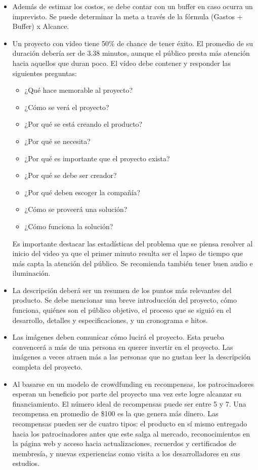 \begin{itemize}
	\item Además de estimar los costos, se debe contar con un buffer en caso ocurra un imprevisto. Se puede determinar la meta a través de la fórmula (Gastos + Buffer) x Alcance.
	\item Un proyecto con video tiene 50\% de chance de tener éxito. El promedio de su duración debería ser de 3.38 minutos, aunque el público presta más atención hacia aquellos que duran poco. El vídeo debe contener y responder las siguientes preguntas:
	\begin{itemize}
		\item ¿Qué hace memorable al proyecto?
		\item ¿Cómo se verá el proyecto?
		\item ¿Por qué se está creando el producto?
		\item ¿Por qué se necesita?
		\item ¿Por qué es importante que el proyecto exista?
		\item ¿Por qué se debe ser creador?
		\item ¿Por qué deben escoger la compañía?
		\item ¿Cómo se proveerá una solución?
		\item ¿Cómo funciona la solución?
	\end{itemize}
	Es importante destacar las estadísticas del problema que se piensa resolver al inicio del video ya que el primer minuto resulta ser el lapso de tiempo que más capta la atención del público. Se recomienda también tener buen audio e iluminación.
	\item La descripción deberá ser un resumen de los puntos más relevantes del producto. Se debe mencionar una breve introducción del proyecto, cómo funciona, quiénes son el público objetivo, el proceso que se siguió en el desarrollo, detalles y especificaciones, y un cronograma e hitos.
	\item Las imágenes deben comunicar cómo lucirá el proyecto. Esta prueba convencerá a más de una persona en querer invertir en el proyecto. Las imágenes a veces atraen más a las personas que no gustan leer la descripción completa del proyecto.
	\item Al basarse en un modelo de crowdfunding en recompensas, los patrocinadores esperan un beneficio por parte del proyecto una vez este logre alcanzar su financiamiento. El número ideal de recompensas puede ser entre 5 y 7. Una recompensa en promedio de \$100 es la que genera más dinero. Las recompensas pueden ser de cuatro tipos: el producto en sí mismo entregado hacia los patrocinadores antes que este salga al mercado, reconocimientos en la página web y acceso hacia actualizaciones, recuerdos y certificados de membresía, y nuevas experiencias como visita a los desarrolladores en sus estudios.
\end{itemize}

